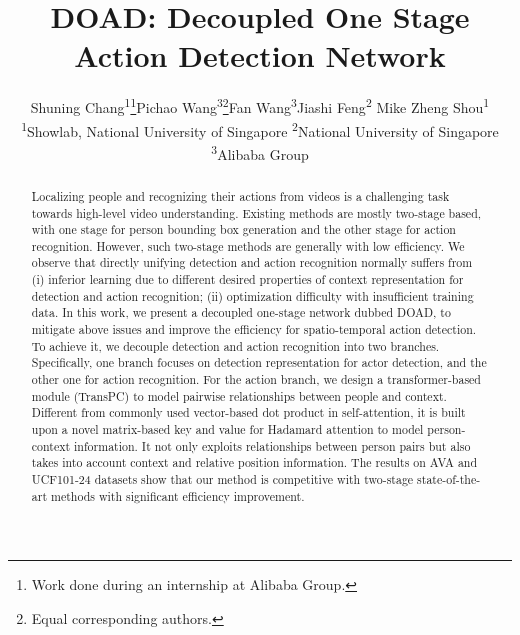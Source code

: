 \documentclass[final]{cvpr}
\begin{document}
\title{DOAD: Decoupled One Stage Action Detection Network}

\author{Shuning Chang\textsuperscript{\rm 1}\thanks{Work done during an internship at Alibaba Group.}\quad Pichao Wang\textsuperscript{\rm 3}\thanks{Equal corresponding authors.}\quad Fan Wang\textsuperscript{\rm 3}\quad Jiashi Feng\textsuperscript{\rm 2} \quad Mike Zheng Shou\textsuperscript{\rm 1}\footnotemark[2] \\ 
\textsuperscript{\rm 1}Showlab, National University of Singapore \quad \textsuperscript{\rm 2}National University of Singapore \quad \textsuperscript{\rm 3}Alibaba Group \\
}

\maketitle




\begin{abstract}
Localizing people and recognizing their actions from videos is a challenging task towards high-level video understanding. Existing methods are mostly two-stage based, with one stage for person bounding box generation and the other stage for action recognition. However, such two-stage methods are generally with low efficiency. We observe that directly unifying detection and action recognition normally suffers from (i) inferior learning  due to different desired properties of context representation for detection and action recognition; (ii) optimization difficulty with insufficient training data. In this work, we present a decoupled one-stage network dubbed DOAD, to mitigate above issues and improve the efficiency for spatio-temporal action detection. To achieve it, we decouple detection and action recognition into two branches. Specifically, one branch focuses on detection representation for actor detection, and the other one for action recognition. For the action branch, we design a transformer-based module (TransPC) to model pairwise relationships between people and context. Different from commonly used vector-based dot product in self-attention, it is built upon a novel matrix-based key and value for Hadamard attention to model person-context information. It not only exploits relationships between person pairs but also takes into account context and relative position information. The results on AVA and UCF101-24 datasets show that our method is competitive with two-stage state-of-the-art methods with significant efficiency improvement.
\end{abstract}
\vspace{-4mm}
\end{document}

